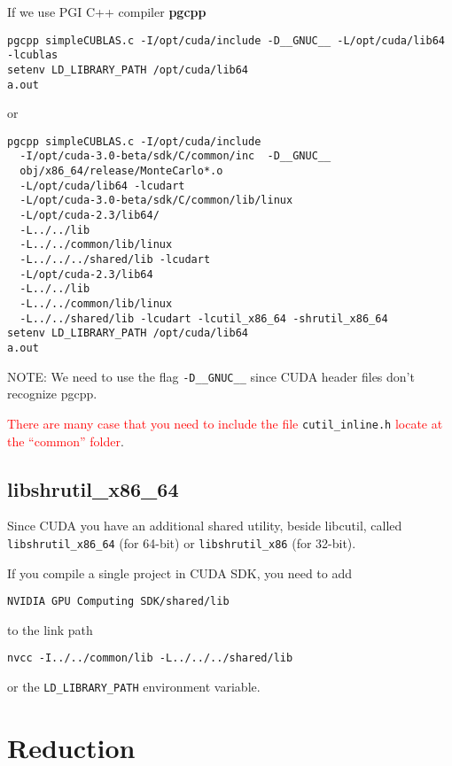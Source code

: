 If we use PGI C++ compiler {\bf pgcpp}
\begin{verbatim}
pgcpp simpleCUBLAS.c -I/opt/cuda/include -D__GNUC__ -L/opt/cuda/lib64 -lcublas
setenv LD_LIBRARY_PATH /opt/cuda/lib64
a.out
\end{verbatim}
or
\begin{verbatim}
pgcpp simpleCUBLAS.c -I/opt/cuda/include 
  -I/opt/cuda-3.0-beta/sdk/C/common/inc  -D__GNUC__ 
  obj/x86_64/release/MonteCarlo*.o 
  -L/opt/cuda/lib64 -lcudart
  -L/opt/cuda-3.0-beta/sdk/C/common/lib/linux 
  -L/opt/cuda-2.3/lib64/
  -L../../lib 
  -L../../common/lib/linux
  -L../../../shared/lib -lcudart
  -L/opt/cuda-2.3/lib64
  -L../../lib
  -L../../common/lib/linux
  -L../../shared/lib -lcudart -lcutil_x86_64 -shrutil_x86_64
setenv LD_LIBRARY_PATH /opt/cuda/lib64
a.out

\end{verbatim}

NOTE: We need to use the flag \verb!-D__GNUC__! since CUDA header
files don't recognize pgcpp. 


\textcolor{red}{There are many case that you need to include the file}
\verb!cutil_inline.h!
\textcolor{red}{locate at the ``common'' folder}.

\subsection{libshrutil\_x86\_64}
\label{sec:libshrutil_x86_64}

Since CUDA you have an additional shared utility, beside libcutil,
called \verb!libshrutil_x86_64! (for 64-bit) or \verb!libshrutil_x86!
(for 32-bit). 

If you compile a single project in CUDA SDK, you need to add
\begin{verbatim}
NVIDIA GPU Computing SDK/shared/lib
\end{verbatim}
to the link path
\begin{verbatim}
nvcc -I../../common/lib -L../../../shared/lib
\end{verbatim}
or the \verb!LD_LIBRARY_PATH! environment variable. 


\section{Reduction}
\label{sec:reduction}

